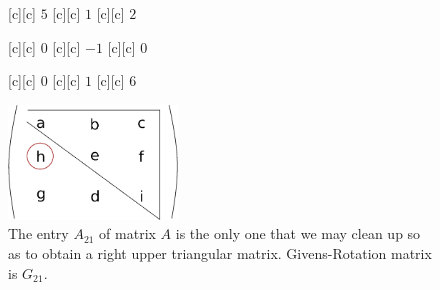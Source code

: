 \begin{figure}[htb!]
	\centering
	\footnotesize

	[c] {$5$}
	[c] {$1$}
	[c] {$2$}

	[c] {$0$}
	[c] {$-1$}
	[c] {$0$}

	[c] {$0$}
	[c] {$1$}
	[c] {$6$}

	\includegraphics[width=0.4\textwidth]{matrixA21.eps}
	\caption{The entry $A_{21}$ of matrix $A$ is the only one that we may clean up
		so as to obtain a right upper triangular matrix. Givens-Rotation matrix is $G_{21}$.}
	\label{\LABEL}
\end{figure}
